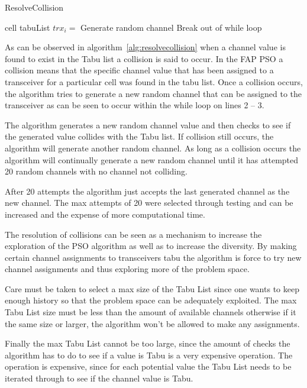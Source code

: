 \begin{algorithm}
\caption{ResolveCollision}
\label{alg:resolvecollision}
\begin{algorithmic}[1]
	\REQUIRE cell
	\REQUIRE tabuList
				\STATE $trx_i = $ Generate random channel
					\STATE Break out of while loop
				\ENDIF
			\ENDWHILE
	\ENDFOR
\end{algorithmic}
\end{algorithm}

As can be observed in algorithm~\ref{alg:resolvecollision} when a channel value is found to exist in the Tabu list a collision is said to occur. In the FAP PSO a collision means that the specific channel value that has been assigned to a transceiver for a particular cell was found in the tabu list. Once a collision occurs, the algorithm tries to generate a new random channel that can be assigned to the transceiver as can be seen to occur within the while loop on lines 2 -- 3.

The algorithm generates a new random channel value and then checks to see if the generated value collides with the Tabu list. If collision still occurs, the algorithm will generate another random channel. As long as a collision occurs the algorithm will continually generate a new random channel until it has attempted 20 random channels with no channel not colliding. 

After 20 attempts the algorithm just accepts the last generated channel as the new channel. The max attempts of 20 were selected through testing and can be increased and the expense of more computational time. 

The resolution of collisions can be seen as a mechanism to increase the exploration of the PSO algorithm as well as to increase the diversity. By making certain channel assignments to transceivers tabu the algorithm is force to try new channel assignments and thus exploring more of the problem space.

Care must be taken to select a max size of the Tabu List since one wants to keep enough history so that the problem space can be adequately exploited. The max Tabu List size must be less than the amount of available channels otherwise if it the same size or larger, the algorithm won't be allowed to make any assignments. 

Finally the max Tabu List cannot be too large, since the amount of checks the algorithm has to do to see if a value is Tabu is a very expensive operation. The operation is expensive, since for each potential value the Tabu List needs to be iterated through to see if the channel value is Tabu.

